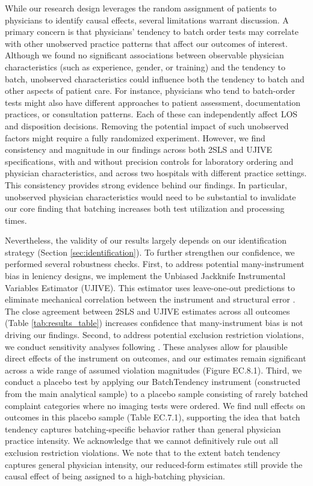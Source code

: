 \documentclass[,,blindrev]{informs}
\begin{document}
While our research design leverages the random assignment of patients to
physicians to identify causal effects, several limitations warrant
discussion. A primary concern is that physicians' tendency to batch
order tests may correlate with other unobserved practice patterns that
affect our outcomes of interest. Although we found no significant
associations between observable physician characteristics (such as
experience, gender, or training) and the tendency to batch, unobserved
characteristics could influence both the tendency to batch and other
aspects of patient care. For instance, physicians who tend to
batch-order tests might also have different approaches to patient
assessment, documentation practices, or consultation patterns. Each of
these can independently affect LOS and disposition decisions. Removing
the potential impact of such unobserved factors might require a fully
randomized experiment. However, we find consistency and magnitude in our
findings across both 2SLS and UJIVE specifications, with and without
precision controls for laboratory ordering and physician
characteristics, and across two hospitals with different practice
settings. This consistency provides strong evidence behind our findings.
In particular, unobserved physician characteristics would need to be
substantial to invalidate our core finding that batching increases both
test utilization and processing times.

Nevertheless, the validity of our results largely depends on our
identification strategy (Section \ref{sec:identification}). To further
strengthen our confidence, we performed several robustness checks.
First, to address potential many-instrument bias in leniency designs, we
implement the Unbiased Jackknife Instrumental Variables Estimator
(UJIVE). This estimator uses leave-one-out predictions to eliminate
mechanical correlation between the instrument and structural error
\citep{kolesar2015manyinvalid, goldsmithpinkham2025leniencydesignsoperatorsmanual}.
The close agreement between 2SLS and UJIVE estimates across all outcomes
(Table \ref{tab:results_table}) increases confidence that
many-instrument bias is not driving our findings. Second, to address
potential exclusion restriction violations, we conduct sensitivity
analyses following \citet{conley2012plausibly}. These analyses allow for
plausible direct effects of the instrument on outcomes, and our
estimates remain significant across a wide range of assumed violation
magnitudes (Figure EC.8.1). Third, we conduct a placebo test by applying
our BatchTendency instrument (constructed from the main analytical
sample) to a placebo sample consisting of rarely batched complaint
categories where no imaging tests were ordered. We find null effects on
outcomes in this placebo sample (Table EC.7.1), supporting the idea that
batch tendency captures batching-specific behavior rather than general
physician practice intensity. We acknowledge that we cannot definitively
rule out all exclusion restriction violations. We note that to the
extent batch tendency captures general physician intensity, our
reduced-form estimates still provide the causal effect of being assigned
to a high-batching physician.
\end{document}
